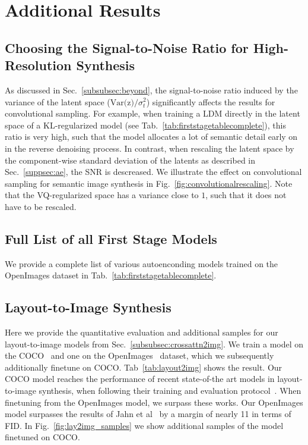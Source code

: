 \documentclass[10pt,twocolumn,letterpaper]{article}
\begin{document}
\newpage
\section{Additional Results}

\subsection{Choosing the Signal-to-Noise Ratio for High-Resolution Synthesis}
\label{suppsec:rescale}
\convolutionalrescaling
As discussed in Sec.~\ref{subsubsec:beyond}, the signal-to-noise ratio induced by the variance of the latent
space (\ie $\text{Var(z)}/\sigma^2_t$) significantly affects the results for convolutional sampling. 
For example, when training a LDM directly in the latent space of a KL-regularized model (see Tab.~\ref{tab:firststagetablecomplete}), 
this ratio is very high, such that the model allocates a lot of semantic detail early on in the reverse denoising process.
In contrast, when rescaling the latent space by the component-wise standard deviation of the latents as described in Sec.~\ref{suppsec:ae}, 
the SNR is descreased. We illustrate the effect on convolutional sampling for semantic image synthesis
in Fig.~\ref{fig:convolutionalrescaling}. Note that the VQ-regularized space has a variance close to $1$, 
such that it does not have to be rescaled.

%


\subsection{Full List of all First Stage Models}
We provide a complete list of various autoenconding  models trained on the OpenImages dataset in Tab.~\ref{tab:firststagetablecomplete}.

\firststagetablecomplete

%
%
%
%
%
%
%

%
%
%
%
%

\subsection{Layout-to-Image Synthesis}
\label{suppsec:bboxtoimage}
\layouttoimagesamples
\layouttoimagefids
Here we provide the quantitative evaluation and additional samples for our layout-to-image models from Sec.~\ref{subsubsec:crossattn2img}. We train a model on the COCO~\cite{DBLP:conf/cvpr/CaesarUF18} and one on the OpenImages~\cite{DBLP:journals/corr/abs-1811-00982} dataset, which we subsequently additionally finetune on COCO. Tab~\ref{tab:layout2img} shows the result. Our COCO model reaches the performance of recent state-of-the art models in layout-to-image synthesis, when following their training and evaluation protocol~\cite{DBLP:conf/aaai/SylvainZBH021}. When finetuning from the OpenImages model, we surpass these works. Our OpenImages model surpasses the results of Jahn et al~\cite{DBLP:journals/corr/abs-2105-06458} by a margin of nearly 11 in terms of FID. In Fig.~\ref{fig:lay2img_samples} we show additional samples of the model finetuned on COCO.
\end{document}
